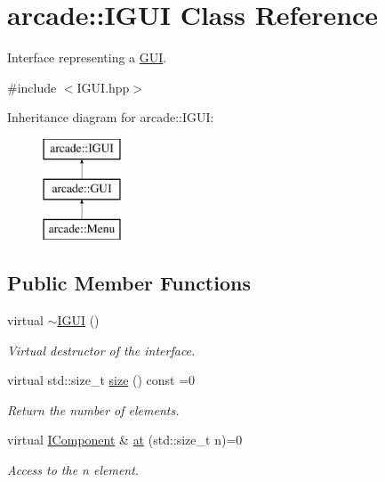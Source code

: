 \hypertarget{classarcade_1_1_i_g_u_i}{}\section{arcade\+:\+:I\+G\+UI Class Reference}
\label{classarcade_1_1_i_g_u_i}


Interface representing a \hyperlink{classarcade_1_1_g_u_i}{G\+UI}.  




{\ttfamily \#include $<$I\+G\+U\+I.\+hpp$>$}

Inheritance diagram for arcade\+:\+:I\+G\+UI\+:\begin{figure}[H]
\begin{center}
\leavevmode
\includegraphics[height=3.000000cm]{classarcade_1_1_i_g_u_i}
\end{center}
\end{figure}
\subsection*{Public Member Functions}
\begin{DoxyCompactItemize}
\item 
virtual \hyperlink{classarcade_1_1_i_g_u_i_ae93e1b1b586b51ebfc760d35c0af3ba3}{$\sim$\+I\+G\+UI} ()
\begin{DoxyCompactList}\small\item\em Virtual destructor of the interface. \end{DoxyCompactList}\item 
virtual std\+::size\+\_\+t \hyperlink{classarcade_1_1_i_g_u_i_a5e9b36772c4affcc58243880e6d51d62}{size} () const =0
\begin{DoxyCompactList}\small\item\em Return the number of elements. \end{DoxyCompactList}\item 
virtual \hyperlink{classarcade_1_1_i_component}{I\+Component} \& \hyperlink{classarcade_1_1_i_g_u_i_aafde8788a75c98d0dfc1161e42e13558}{at} (std\+::size\+\_\+t n)=0
\begin{DoxyCompactList}\small\item\em Access to the n element. \end{DoxyCompactList}\end{DoxyCompactItemize}



